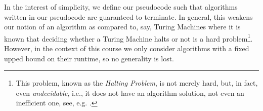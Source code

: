 In the interest of simplicity, we define our pseudocode such that algorithms written in our pseudocode are guaranteed to terminate. In general, this weakens our notion of an algorithm as compared to, say, Turing Machines where it is known that deciding whether a Turing Machine halts or not is a hard problem\footnote{This problem, known as the \emph{Halting Problem}, is not merely hard, but, in fact, even \emph{undecidable}, i.e., it does not have an algorithm solution, not even an inefficient one, see, e.g. \cite[Chapters 1.2.3]{goldreichcomplexity}.}. However, in the context of this course we only consider  algorithms with a fixed upped bound on their runtime, so no generality is lost.